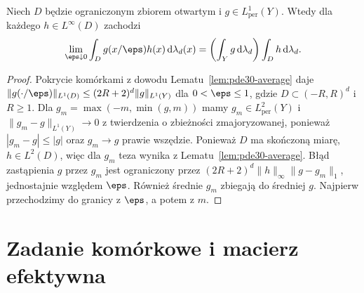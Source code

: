\begin{wniosek}
\label{cor:pde30-average-L1}
Niech $D$ będzie ograniczonym zbiorem otwartym
i $g\in L^1_{\mathrm{per}}(Y)$. Wtedy dla każdego
$h\in L^\infty(D)$ zachodzi
\[
 \lim_{\eps\downarrow0}\int_D g(x/\eps)h(x)\,
 \mathrm d\lambda_d(x)
 =\left(\int_Yg\,\mathrm d\lambda_d\right)
   \int_Dh\,\mathrm d\lambda_d .
\]
\end{wniosek}
\begin{proof}
Pokrycie komórkami z dowodu Lematu~\ref{lem:pde30-average}
daje $\|g(\cdot/\eps)\|_{L^1(D)}
\le (2R+2)^d\|g\|_{L^1(Y)}$ dla $0<\eps\le1$,
gdzie $D\subset(-R,R)^d$ i $R\ge1$.
Dla $g_m=\max(-m,\min(g,m))$ mamy
$g_m\in L^2_{\mathrm{per}}(Y)$ i
$\|g_m-g\|_{L^1(Y)}\to0$ z twierdzenia
o zbieżności zmajoryzowanej, ponieważ
$|g_m-g|\le|g|$ oraz $g_m\to g$ prawie wszędzie.
Ponieważ $D$ ma skończoną miarę, $h\in L^2(D)$,
więc dla $g_m$ teza wynika z Lematu~\ref{lem:pde30-average}.
Błąd zastąpienia $g$ przez $g_m$ jest ograniczony
przez $(2R+2)^d\|h\|_\infty\|g-g_m\|_1$,
jednostajnie względem $\eps$. Również średnie
$g_m$ zbiegają do średniej $g$.
Najpierw przechodzimy do granicy z $\eps$,
a potem z $m$.
\end{proof}

\section{Zadanie komórkowe i macierz efektywna}

